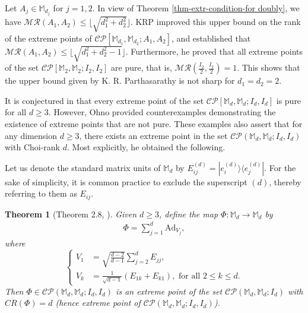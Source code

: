 \documentclass[10pt,reqno]{amsart}
\theoremstyle{definition}
\theoremstyle{plain}
\newtheorem{thm}[defn]{Theorem}
\theoremstyle{remark}
\newcommand{\mbb}[1]{\mathbb{#1}}
\newcommand{\msc}[1]{\mathscr{#1}}
\newcommand{\M}[1]{\mbb{M}_{#1}}%
\newcommand{\ranko}[2]{|{#1}\rangle\langle{#2}|}
\numberwithin{equation}{section}%
\begin{document}
 
  Let $A_j\in\M{d_j}$ for $j=1,2$. In view of Theorem \ref{thm-extr-condition-for doubly}, we have $\msc{MR}(A_1,A_2)\leq \lfloor{\sqrt{d_1^2+d_2^2}}\rfloor$. KRP \cite{krp05} improved this upper bound on the rank of the extreme points of $\msc{CP}[\M{d_1},\M{d_2}; A_1,A_2]$, and established that $\msc{MR}(A_1,A_2)\leq \lfloor{\sqrt{d_1^2+d_2^2-1}}\rfloor$. Furthermore, he proved that all extreme points of the set $\msc{CP}[\M{2},\M{2}; I_2, I_2]$ are pure, that is, $\msc{MR}(\frac{I_2}{2},\frac{I_2}{2})=1$. This shows that the upper bound given by K. R. Parthasarathy is not sharp for $d_1=d_2=2$. 
  
  
  
  
  It is conjectured in \cite{PrSa07} that every extreme point of the set $\msc{CP}[\M{d},\M{d}; I_d, I_d]$ is pure for all $d\geq 3$. However, Ohno \cite{Ohno10} provided counterexamples demonstrating the existence of extreme points that are not pure. These examples also assert that for any dimension $d\geq 3$, there exists an extreme point in the set $\msc{CP}(\M{d},\M{d}; I_{d}, I_{d})$ with Choi-rank $d$. Most explicitly, he obtained the following. 
  
  
  Let us denote the standard matrix units of $\M{d}$ by $E_{ij}^{(d)}=\ranko{e_i^{(d)}}{e_j^{(d)}}$. For the sake of simplicity, it is common practice to exclude the superscript $(d)$, thereby referring to them as $E_{ij}$.
  
  
  
 \begin{thm}[Theorem 2.8, \cite{Ohno10}]\label{thm-extrem-rank-lowerbound}
	Given $d\geq 3$, define the map $\Phi:\M{d}\to\M{d}$ by
	\begin{align}\label{eq-extreme-rank-lowerbound-2}
		\Phi=\sum_{j=1}^{d}\mathrm{Ad}_{V_j},
	\end{align}
	where
	\begin{equation}\label{eq-extreme-rank-lowerbound}
		\begin{cases}
			V_1&=\sqrt{\frac{d-2}{d-1}}\sum\limits_{j=2}^{d}E_{jj},\\
			V_k&=\frac{1}{\sqrt{d-1}}(E_{1k}+E_{k1}), \text{ for all } 2\leq k\leq d.
		\end{cases}
	\end{equation}
	Then $\Phi\in\msc{CP}(\M{d},\M{d}; I_{d}, I_{d})$ is an extreme point of the set $\msc{CP}(\M{d},\M{d}; I_{d})$ with $CR(\Phi)=d$ (hence extreme point of $\msc{CP}(\M{d},\M{d}; I_{d}, I_{d})$).
 \end{thm}
\end{document}
